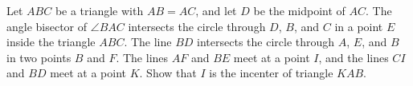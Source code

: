 Let $ABC$ be a triangle with $AB = AC$, and let $D$ be the midpoint of $AC$. The angle bisector of $\angle BAC$ intersects the circle through $D$, $B$, and $C$ in a point $E$ inside the triangle $ABC$. The line $BD$ intersects the circle through $A$, $E$, and $B$ in two points $B$ and $F$. The lines $AF$ and $BE$ meet at a point $I$, and the lines $CI$ and $BD$ meet at a point $K$. Show that $I$ is the incenter of triangle $KAB$.
